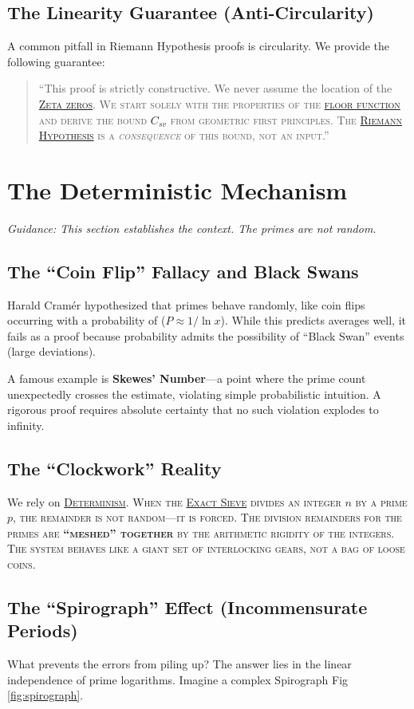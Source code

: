 \documentclass[sn-mathphys-num, pdflatex, referee]{sn-jnl}
\newcommand{\gterm}[2]{\begingroup\normalfont\scshape\hyperlink{#1}{#2}\endgroup}
\begin{document}
\subsection{The Linearity Guarantee (Anti-Circularity)}
A common pitfall in Riemann Hypothesis proofs is circularity. We provide the following guarantee:
\begin{quote}
``This proof is strictly constructive. We never assume the location of the \gterm{zeta}{Zeta zeros}. We start solely with the properties of the \gterm{floor_function}{floor function} and derive the bound \gterm{csv}{$C_{sv}$}  from geometric first principles. The \gterm{rh}{Riemann Hypothesis} is a \textit{consequence} of this bound, not an input.''
\end{quote}
\section{The Deterministic Mechanism}
\label{sec:mech}

\textit{Guidance: This section establishes the context. The primes are not random.} 

\subsection{The ``Coin Flip'' Fallacy and Black Swans}
Harald Cramér hypothesized that primes behave randomly, like coin flips occurring with a probability of ($P \approx 1/\ln x$). While this predicts averages well, it fails as a proof because probability admits the possibility of ``Black Swan'' events (large deviations). 

A famous example is \textbf{Skewes' Number}---a point where the prime count unexpectedly crosses the estimate, violating simple probabilistic intuition. A rigorous proof requires absolute certainty that no such violation explodes to infinity.

\subsection{The ``Clockwork'' Reality}
We rely on \gterm{deterministic}{Determinism}. When the \gterm{exact_sieve}{Exact Sieve} divides an integer $n$ by a prime $p$, the remainder is not random---it is forced. The division remainders for the primes are \textbf{``meshed'' together} by the arithmetic rigidity of the integers. The system behaves like a giant set of interlocking gears, not a bag of loose coins.

\subsection{The ``Spirograph'' Effect (Incommensurate Periods)}
What prevents the errors from piling up? The answer lies in the linear independence of prime logarithms. Imagine a complex Spirograph Fig \ref{fig:spirograph}.
\end{document}
